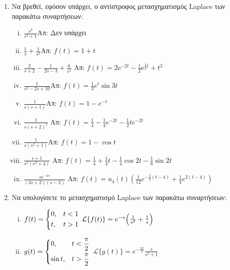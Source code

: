\begin{enumerate}
  \item Να βρεθεί, εφόσον υπάρχει, ο αντίστροφος μετασχηματισμός Laplace των 
    παρακάτω συναρτήσεων:
    \begin{enumerate}[i)]
      \item $\frac{s^2}{s^2+1}$\hfill Απ: Δεν υπάρχει
      \item $\frac{1}{s}+\frac{1}{s^2}$\hfill Απ: $f(t)=1+t$
      \item $ \frac{2}{s+2} - \frac{1}{2s-3} + \frac{6}{s^{4}} $ 
        \hfill Απ: $ f(t) = 2 \mathrm{e}^{-2t}-\frac{1}{2} \mathrm{e}^{\frac{3}{2} t} +
        t^{3}$  
      \item $\frac{1}{s^2-2s+10}$\hfill Απ: $f(t)=\frac{1}{3}e^t\sin 3t$
      \item $\frac{1}{s(s+1)}$\hfill Απ: $f(t)=1-e^{-t}$
      \item $\frac{1}{s(s+2)^2}$
        \hfill Απ: $f(t)=\frac{1}{4}-\frac{1}{4}e^{-2t}-\frac{1}{2}te^{-2t}$
      \item $\frac{1}{s(s^2+1)}$\hfill Απ: $f(t)=1-\cos t$
      \item $\frac{s+1}{s^{2}(s^{2}+4)}$ 
        \hfill Απ: $f(t)=\frac{1}{4}+\frac{1}{4}t-\frac{1}{4}\cos 2t -\frac{1}{8}\sin 2t$
      \item $\frac{se^{-4s}}{(3s+2)(s-2)}$ 
        \hfill Απ: $f(t)=u_{4}(t)\left(\frac{1}{12}e^{-\frac{2}{3}(t-4)}+
        \frac{1}{4}e^{2(t-4)}\right)$

    \end{enumerate}

  \item Να υπολογίσετε το μετασχηματισμό Laplace των παρακάτω συναρτήσεων:
    \begin{enumerate}[i)]
      \item $f(t)=
        \begin{dcases} 
          0, & t<1 \\ t, & t>1 
        \end{dcases}$ 
        \hfill $\mathcal{L}\{f(t)\}=e^{-s}\Bigl(\frac{1}{s^2}+\frac{1}{s}\Bigr)$

      \item $g(t)=
        \begin{dcases} 
          0, & t<\frac{\pi}{2} \\ \sin t, & t>\frac{\pi}{2}
        \end{dcases}$ 
        \hfill $\mathcal{L}\{g(t)\}=e^{-\frac{s\pi}{2}}\frac{s}{s^2+1}$


\end{enumerate}
\end{enumerate}
